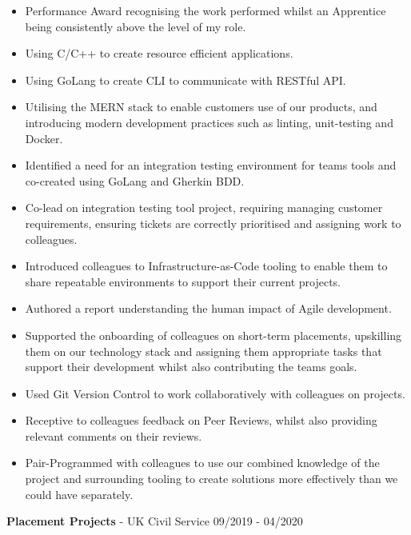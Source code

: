 \documentclass{article}
\begin{document}
\begin{multicols}{2}
\begin{itemize}
\itemsep0em
	\item Performance Award recognising the work performed whilst an Apprentice being consistently above the level of my role.
	\item Using C/C++ to create resource efficient applications.
	\item Using GoLang to create CLI to communicate with RESTful API.
	\item Utilising the MERN stack to enable customers use of our products, and introducing modern development practices such as linting, unit-testing and Docker.
	\item Identified a need for an integration testing environment for teams tools and co-created using GoLang and Gherkin BDD.
	\item Co-lead on integration testing tool project, requiring managing customer requirements, ensuring tickets are correctly prioritised and assigning work to colleagues.
	\item Introduced colleagues to Infrastructure-as-Code tooling to enable them to share repeatable environments to support their current projects.
	\item Authored a report understanding the human impact of Agile development.
	\item Supported the onboarding of colleagues on short-term placements, upskilling them on our technology stack and assigning them appropriate tasks that support their development whilst also contributing the teams goals.
	\item Used Git Version Control to work collaboratively with colleagues on projects.
	\item Receptive to colleagues feedback on Peer Reviews, whilst also providing relevant comments on their reviews.
	\item Pair-Programmed with colleagues to use our combined knowledge of the project and surrounding tooling to create solutions more effectively than we could have separately.
\end{itemize}
\end{multicols}

\textbf{Placement Projects} - UK Civil Service \hfill 09/2019 - 04/2020
\end{document}
